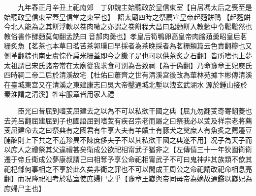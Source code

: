 　　九年春正月辛丑上祀南郊　丁卯魏主始聽政於皇信東室【自居馮太后之喪至是始聽政皇信東室蓋皇信堂之東室也】　詔太廟四時之祭薦宣皇帝起麪餅鴨【起麪餅今北人能為之其餅浮軟以卷肉噉之亦謂之卷餅程大昌曰起麪餅入教麪中令鬆鬆然也教俗書作酵麪莫甸翻孟詵曰音郝肉羮也】孝皇后筍鴨卵高皇帝肉膾葅羮昭皇后茗粣炙魚【茗茶也本草曰茗苦茶郭璞曰早採者為茶晩採者為茗粣類篇云色責翻糝也又側革翻粽也南史虞悰作扁米粣蓋即今之饊子是也可以供茶炙之石翻】皆所嗜也上夢太祖謂已宋氏諸帝常在太廟從我求食可别為吾致祠【為于偽翻】乃命豫章王妃庾氏四時祠二帝二后於清溪故宅【杜佑曰蕭齊之世有清溪宫後改為華林苑據卞彬傳清溪在臺城東宫又在清溪之東建康志曰吳大帝鑿通城北塹以洩玄武湖水源於鍾山接於秦淮謂之清溪】牲牢服章皆用家人禮

　　臣光曰昔屈到嗜芰屈建去之以為不可以私欲干國之典【屈九勿翻芰奇寄翻菱也去羌呂翻屈建屈到子也國語屈到嗜芰有疾召宗老而屬之曰祭我必以芰及祥宗老將薦芰屈建命去之曰祭典有之國君有牛享大夫有羊饋士有豚犬之奠庶人有魚炙之薦籩豆脯醢則上下共之不羞珍異不陳庶侈夫子不以其私欲干國之典遂不用】况子為天子而以庶人之禮祭其父違禮甚矣衛成公欲祀相甯武子猶非之【左傳僖三十一年狄圍衛衛遷于帝丘衛成公夢康叔謂己曰相奪予享公命祀相甯武子不可曰鬼神非其族類不歆其祀杞鄫何事相之不享於此久矣非衛之罪也不可以間成王周公之命祀請改祀命相息亮翻】而况降祀祖考於私室使庶婦尸之乎【豫章王嶷與帝同母帝為嫡故通鑑以嶷妃為庶婦尸主也】

